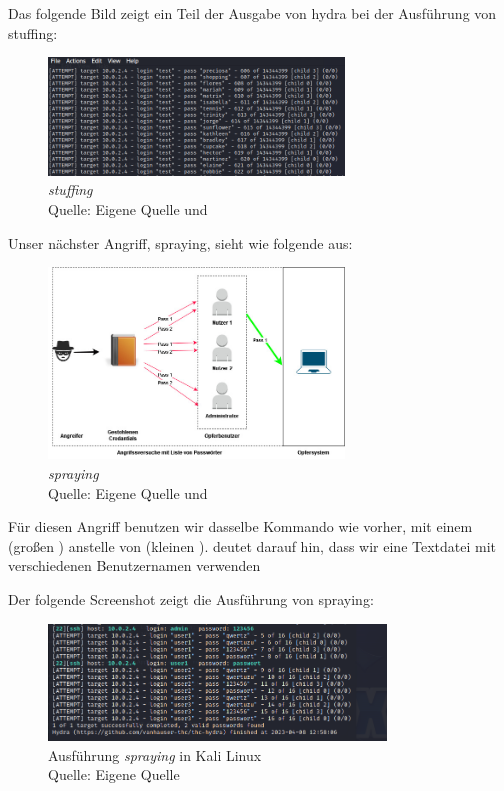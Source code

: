 Das folgende Bild zeigt ein Teil der Ausgabe von \gls{hydra} bei der Ausführung von \gls{stuffing}:
\begin{figure}[H]
   \centering
   \includegraphics[width=0.7\textwidth]{assets/stuffing_kali.png}
   \caption{\textit{\gls{stuffing}}\\Quelle: Eigene Quelle und \citep{Nguyen_stuffing}}
   \centering
\end{figure}

Unser nächster Angriff, \gls{spraying}, sieht wie folgende aus:
\begin{figure}[H]
   \centering
   \includegraphics[width=0.7\textwidth]{assets/Spraying.jpg}
   \caption{\textit{\gls{spraying}}\\Quelle: Eigene Quelle und \citep{Swathi_spraxy}}
   \centering
\end{figure}

Für diesen Angriff benutzen wir dasselbe Kommando wie vorher, mit einem  (großen ) anstelle von  (kleinen ).  deutet darauf hin, dass wir eine Textdatei mit verschiedenen Benutzernamen verwenden 

Der folgende Screenshot zeigt die Ausführung von \gls{spraying}:
\begin{figure}[H]
   \centering
   \includegraphics[width=0.8\textwidth]{assets/Spraying_Kali.png}
   \caption{Ausführung \textit{\gls{spraying}} in Kali Linux \\Quelle: Eigene Quelle}
   \centering
\end{figure}


